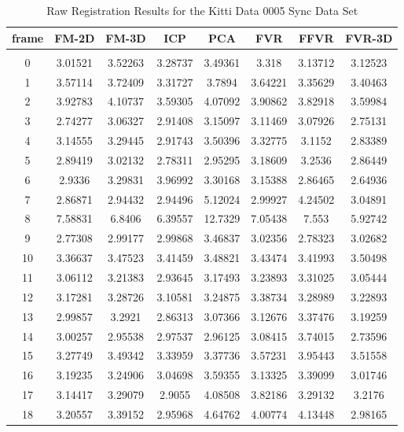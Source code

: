\begin{center}
\begin{longtable}{cccccccc}
\caption{Raw Registration Results for the Kitti Data 0005 Sync Data Set}
\label{tab:kittidata0005syncFULL}
\endfirsthead
\endhead
\textbf{frame} & \textbf{FM-2D} & \textbf{FM-3D} & \textbf{ICP} & \textbf{PCA} & \textbf{FVR} & \textbf{FFVR} & \textbf{FVR-3D} \\
\hline \\
0 & 3.01521 & 3.52263 & 3.28737 & 3.49361 & 3.318 & 3.13712 & 3.12523\\
1 & 3.57114 & 3.72409 & 3.31727 & 3.7894 & 3.64221 & 3.35629 & 3.40463\\
2 & 3.92783 & 4.10737 & 3.59305 & 4.07092 & 3.90862 & 3.82918 & 3.59984\\
3 & 2.74277 & 3.06327 & 2.91408 & 3.15097 & 3.11469 & 3.07926 & 2.75131\\
4 & 3.14555 & 3.29445 & 2.91743 & 3.50396 & 3.32775 & 3.1152 & 2.83389\\
5 & 2.89419 & 3.02132 & 2.78311 & 2.95295 & 3.18609 & 3.2536 & 2.86449\\
6 & 2.9336 & 3.29831 & 3.96992 & 3.30168 & 3.15388 & 2.86465 & 2.64936\\
7 & 2.86871 & 2.94432 & 2.94496 & 5.12024 & 2.99927 & 4.24502 & 3.04891\\
8 & 7.58831 & 6.8406 & 6.39557 & 12.7329 & 7.05438 & 7.553 & 5.92742\\
9 & 2.77308 & 2.99177 & 2.99868 & 3.46837 & 3.02356 & 2.78323 & 3.02682\\
10 & 3.36637 & 3.47523 & 3.41459 & 3.48821 & 3.43474 & 3.41993 & 3.50498\\
11 & 3.06112 & 3.21383 & 2.93645 & 3.17493 & 3.23893 & 3.31025 & 3.05444\\
12 & 3.17281 & 3.28726 & 3.10581 & 3.24875 & 3.38734 & 3.28989 & 3.22893\\
13 & 2.99857 & 3.2921 & 2.86313 & 3.07366 & 3.12676 & 3.37476 & 3.19259\\
14 & 3.00257 & 2.95538 & 2.97537 & 2.96125 & 3.08415 & 3.74015 & 2.73596\\
15 & 3.27749 & 3.49342 & 3.33959 & 3.37736 & 3.57231 & 3.95443 & 3.51558\\
16 & 3.19235 & 3.24906 & 3.04698 & 3.59355 & 3.13325 & 3.39099 & 3.01746\\
17 & 3.14417 & 3.29079 & 2.9055 & 4.08508 & 3.82186 & 3.29132 & 3.2176\\
18 & 3.20557 & 3.39152 & 2.95968 & 4.64762 & 4.00774 & 4.13448 & 2.98165\\

\end{longtable}
\end{center}
